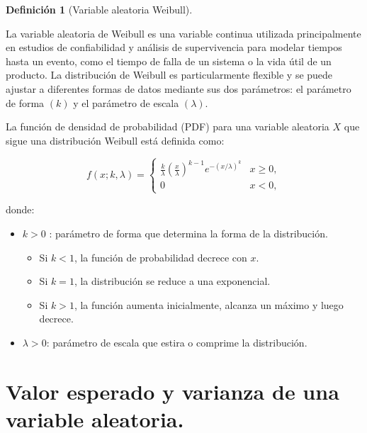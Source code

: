 \documentclass[
  us-letterpaper,
]{scrreprt}
\theoremstyle{plain}
\theoremstyle{plain}
\theoremstyle{definition}
\newtheorem{definition}{Definición}[chapter]
\theoremstyle{remark}
\begin{document}
\begin{definition}[Variable aleatoria
Weibull]\protect\hypertarget{def-var_ale_weibull}{}\label{def-var_ale_weibull}

La variable aleatoria de Weibull es una variable continua utilizada
principalmente en estudios de confiabilidad y análisis de supervivencia
para modelar tiempos hasta un evento, como el tiempo de falla de un
sistema o la vida útil de un producto. La distribución de Weibull es
particularmente flexible y se puede ajustar a diferentes formas de datos
mediante sus dos parámetros: el parámetro de forma \((k)\) y el
parámetro de escala \((\lambda)\).

La función de densidad de probabilidad (PDF) para una variable aleatoria
\(X\) que sigue una distribución Weibull está definida como:

\[f(x; k, \lambda) = \begin{cases} \frac{k}{\lambda} \left( \frac{x}{\lambda} \right)^{k-1} e^{-(x/\lambda)^k} & x \geq 0, \\ 0 & x < 0, \end{cases}\]

donde:

\begin{itemize}
\item
  \(k>0\) : parámetro de forma que determina la forma de la
  distribución.

  \begin{itemize}
  \item
    Si \(k<1\), la función de probabilidad decrece con \(x\).
  \item
    Si \(k= 1\), la distribución se reduce a una exponencial.
  \item
    Si \(k > 1\), la función aumenta inicialmente, alcanza un máximo y
    luego decrece.
  \end{itemize}
\item
  \(\lambda > 0\): parámetro de escala que estira o comprime la
  distribución.
\end{itemize}

\end{definition}

\section{Valor esperado y varianza de una variable
aleatoria.}\label{valor-esperado-y-varianza-de-una-variable-aleatoria.}
\end{document}
